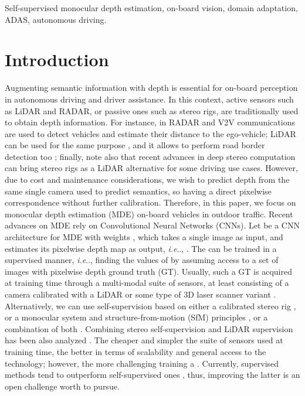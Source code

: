 \documentclass[journal]{IEEEtran}
\makeatletter
\DeclareRobustCommand\onedot{\futurelet\@let@token\@onedot}
\def\@onedot{\ifx\@let@token.\else.\null\fi\xspace}
\def\ie{\emph{i.e}\onedot} \def\Ie{\emph{I.e}\onedot}
\makeatother
\begin{document}
\begin{IEEEkeywords}
Self-supervised monocular depth estimation, on-board vision, domain adaptation, ADAS, autonomous driving.
\end{IEEEkeywords}

\section{Introduction}

Augmenting semantic information with depth is essential for on-board perception in autonomous driving and driver assistance. In this context, active sensors such as LiDAR and RADAR, or passive ones such as stereo rigs, are traditionally used to obtain depth information. For instance, in \cite{Dokhanchi:2021} RADAR and V2V communications are used to detect vehicles and estimate their distance to the ego-vehicle; LiDAR can be used for the same purpose \cite{Zhou:2018}, and it allows to perform road border detection too \cite{Deac:2019}; finally, note also that recent advances in deep stereo computation \cite{Cheng:2020} can bring stereo rigs as a LiDAR alternative for some driving use cases. However, due to cost and maintenance considerations, we wish to predict depth from the same single camera used to predict semantics, so having a direct pixelwise correspondence without further calibration. Therefore, in this paper, we focus on monocular depth estimation (MDE) on-board vehicles in outdoor traffic. Recent advances on MDE rely on Convolutional Neural Networks (CNNs). Let  be a CNN architecture for MDE with weights , which takes a single image  as input, and estimates its pixelwise depth map  as output, {\ie}, . The  can be trained in a supervised manner, {\ie}, finding the values of  by assuming access to a set of images with pixelwise depth ground truth (GT). Usually, such a GT is acquired at training time through a multi-modal suite of sensors, at least consisting of a camera calibrated with a LiDAR or some type of 3D laser scanner variant \cite{Eigen:2014, Liu:2016, Roy:2016, Laina:2016, Cao:2017, Fu:2018DORN, Gurram:2018, He:2018, Xu:2018, Yin:2019}. Alternatively, we can use self-supervision based on either a calibrated stereo rig \cite{Saxena:2007, Garg:2016, Godard:2017, Pillai:2019}, or a monocular system and structure-from-motion (SfM) principles \cite{Zhou:2017, Yin:2018GeoNet, Zhao:2020, Guizilini:20203D}, or a combination of both \cite{Godard:2019MonoDepth2}. Combining stereo self-supervision and LiDAR supervision has been also analyzed \cite{Kuznietsov:2017, He:2018wearable, Guizilini:2020}. The cheaper and simpler the suite of sensors used at training time, the better in terms of scalability and general access to the technology; however, the more challenging training a . Currently, supervised methods tend to outperform self-supervised ones \cite{De:2021}, thus, improving the latter is an open challenge worth to pursue.   
\end{document}
